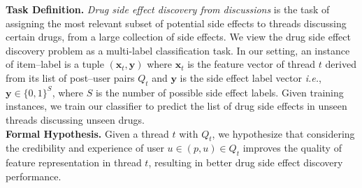 \documentclass{bmcart}
\begin{document}
{\bf Task Definition.} 
{\it Drug side effect discovery from discussions} 
is the task of assigning the most relevant subset of potential
side effects to threads discussing certain drugs, from a large
collection of side effects. We view the drug side effect
discovery problem as a multi-label classification task. In our
setting, an instance of item--label is a tuple
$\left(\boldsymbol{x}_{t},\boldsymbol{y}\right)$ where
$\boldsymbol{x}_{t}$ is the feature vector of thread $t$ derived from
its list of
post--user pairs $Q_{t}$
and $\boldsymbol{y}$ is the side effect label vector \textit{i.e.}, $\boldsymbol{y}\in\{0, 1\}^S$, where $S$ is the number of possible side effect labels. Given training instances, we train our classifier to predict the list of drug side effects in unseen threads discussing unseen drugs. \\


{\bf Formal Hypothesis.} Given a thread $t$ with $Q_t$, 
we hypothesize that considering the credibility and experience of user $u \in \left(p, u\right) \in Q_t$ improves the quality of feature representation in thread $t$, resulting in better drug side effect discovery performance. \\
\end{document}
